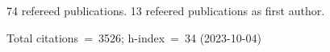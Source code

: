 74 refereed publications. 13 refeered publications as first author.

Total citations~=~3526; h-index~=~34 (2023-10-04)
